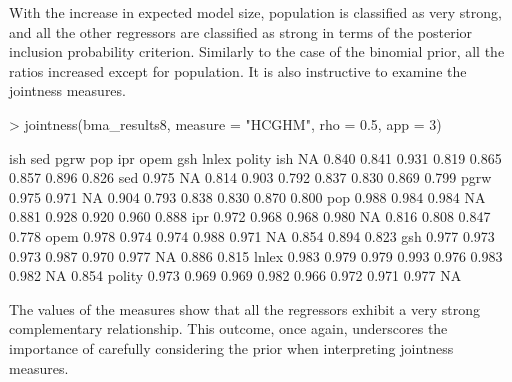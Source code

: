 \documentclass[a4paper]{article}
\begin{document}
With the increase in expected model size, population is classified as very strong, and all the other regressors are classified as strong in terms of the posterior inclusion probability criterion. Similarly to the case of the binomial prior, all the ratios increased except for population. It is also instructive to examine the jointness measures.
\begin{Schunk}
\begin{Sinput}
> jointness(bma_results8, measure = "HCGHM", rho = 0.5, app = 3)
\end{Sinput}
\begin{Soutput}
         ish   sed  pgrw   pop   ipr  opem   gsh lnlex polity
ish       NA 0.840 0.841 0.931 0.819 0.865 0.857 0.896  0.826
sed    0.975    NA 0.814 0.903 0.792 0.837 0.830 0.869  0.799
pgrw   0.975 0.971    NA 0.904 0.793 0.838 0.830 0.870  0.800
pop    0.988 0.984 0.984    NA 0.881 0.928 0.920 0.960  0.888
ipr    0.972 0.968 0.968 0.980    NA 0.816 0.808 0.847  0.778
opem   0.978 0.974 0.974 0.988 0.971    NA 0.854 0.894  0.823
gsh    0.977 0.973 0.973 0.987 0.970 0.977    NA 0.886  0.815
lnlex  0.983 0.979 0.979 0.993 0.976 0.983 0.982    NA  0.854
polity 0.973 0.969 0.969 0.982 0.966 0.972 0.971 0.977     NA
\end{Soutput}
\end{Schunk}
The values of the measures show that all the regressors exhibit a very strong complementary relationship. This outcome, once again, underscores the importance of carefully considering the prior when interpreting jointness measures.
\end{document}
